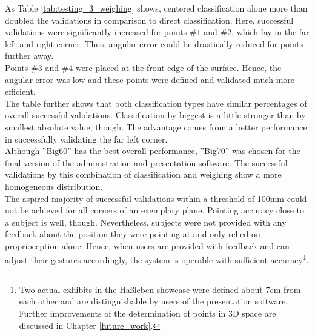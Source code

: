 As Table \ref{tab:testing_3_weighing} shows, centered classification alone more than doubled the validations in comparison to direct classification. Here, successful validations were significantly increased for points $\#1$ and $\#2$, which lay in the far left and right corner. Thus, angular error could be drastically reduced for points further away.
\\
Points $\#3$ and $\#4$ were placed at the front edge of the surface. Hence, the angular error was low and these points were defined and validated much more efficient.
\\
The table further shows that both classification types have similar percentages of overall successful validations. Classification by biggest is a little stronger than by smallest absolute value, though. The advantage comes from a better performance in successfully validating the far left corner.
\\
Although ''Big60'' has the best overall performance, ''Big70'' was chosen for the final version of the administration and presentation software. The successful validations by this combination of classification and weighing show a more homogeneous distribution. 
\\
The aspired majority of successful validations within a threshold of 100mm could not be achieved for all corners of an exemplary plane. Pointing accuracy close to a subject is well, though. Nevertheless, subjects were not provided with any feedback about the position they were pointing at and only relied on proprioception alone. Hence, when users are provided with feedback and can adjust their gestures accordingly, the system is operable with sufficient accuracy\footnote{Two actual exhibits in the Haßleben-showcase were defined about 7cm from each other and are distinguishable by users of the presentation software. Further improvements of the determination of points in \ac{3D} space are discussed in Chapter \ref{future_work}.}. 

